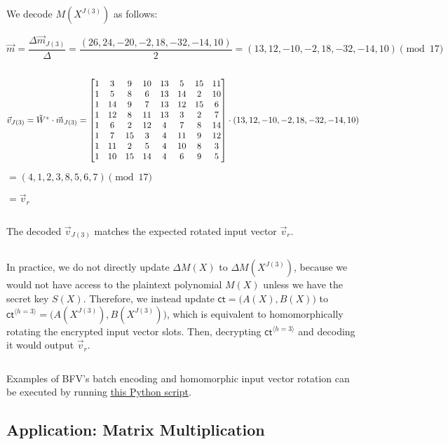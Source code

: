 We decode $M(X^{J(3)})$ as follows: 

$\vec{m} = \dfrac{\Delta \vec{m}_{J(3)}}{\Delta} = \dfrac{(26, 24, -20, -2, 18, -32, -14, 10)}{2} = (13, 12, -10, -2, 18, -32, -14, 10) \pmod{17}$

$ $


$\vec{v}_{J(3)} = \tilde{W}^* \cdot \vec{m}_{J(3)} = \begin{bmatrix}
1&3&9&10&13&5&15&11\\
1&5&8&6&13&14&2&10\\
1&14&9&7&13&12&15&6\\
1&12&8&11&13&3&2&7\\
1&6&2&12&4&7&8&14\\
1&7&15&3&4&11&9&12\\
1&11&2&5&4&10&8&3\\
1&10&15&14&4&6&9&5\\
\end{bmatrix} \cdot (13, 12, -10, -2, 18, -32, -14, 10) $

$= (4, 1, 2, 3, 8, 5, 6, 7) \pmod{17}$

$= \vec{v}_r$

$ $

The decoded $\vec{v}_{J(3)}$ matches the expected rotated input vector $\vec{v}_r$.  


$ $

In practice, we do not directly update $\Delta M(X)$ to $\Delta M(X^{J(3)})$, because we would not have access to the plaintext polynomial $M(X)$ unless we have the secret key $S(X)$. Therefore, we instead update $\textsf{ct}=\bm(A(X), B(X)\bm)$ to $\textsf{ct}^{\langle h=3 \rangle}=\bm(A(X^{J(3)}), B(X^{J(3)})\bm)$, which is equivalent to homomorphically rotating the encrypted input vector slots. Then, decrypting $\textsf{ct}^{\langle h=3 \rangle}$ and decoding it would output $\vec{v}_r$.

$ $




 Examples of BFV's batch encoding and homomorphic input vector rotation can be executed by running \href{https://github.com/fhetextbook/fhe-textbook/blob/main/source%20code/bfv.py}{\underline{this Python script}}. 



\subsection{Application: Matrix Multiplication}
\label{subsec:bfv-matrix-multiplication}

